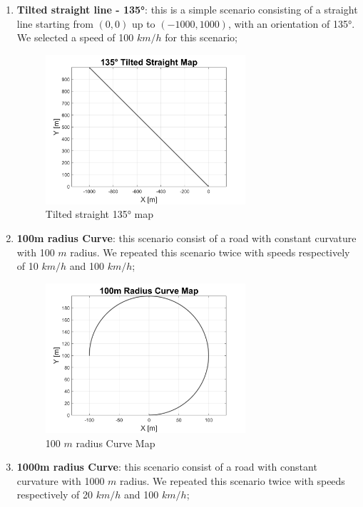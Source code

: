 \begin{enumerate}
\pagebreak
    \item \textbf{Tilted straight line - 135°}: this is a simple scenario consisting of a straight line starting from $(0,0)$ up to $(-1000,1000)$, with an orientation of 135°. We selected a speed of 100 $km/h$ for this scenario;
     \begin{figure}[H]
    \centering
    \includegraphics[width=0.7\textwidth]{Figures/Tilted135Map.png}
    \caption{Tilted straight 135° map}
      \label{fig:Tilted135Map}
\end{figure}
\vspace{1cm}
    \item \textbf{100m radius Curve}: this scenario consist of a road with constant curvature with 100 $m$ radius. We repeated this scenario twice with speeds respectively of 10 $km/h$ and 100 $km/h$;
     \begin{figure}[H]
    \centering
    \includegraphics[width=0.7\textwidth]{Figures/ShortCurveMap.png}
    \caption{100 $m$ radius Curve Map}
      \label{fig:100mCurveMap}
\end{figure}
\pagebreak
    \item \textbf{1000m radius Curve}: this scenario consist of a road with constant curvature with 1000 $m$ radius. We repeated this scenario twice with speeds respectively of 20 $km/h$ and 100 $km/h$;

\end{enumerate}
